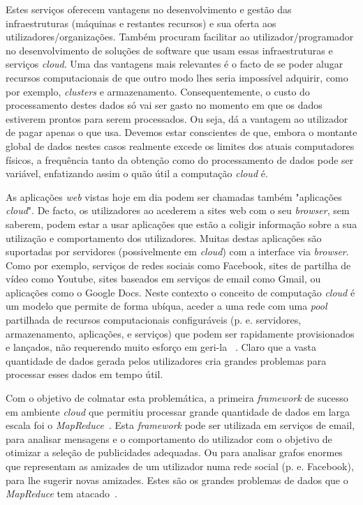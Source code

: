 Estes serviços oferecem vantagens no desenvolvimento e gestão das infraestruturas (máquinas e restantes recursos) e sua oferta aos utilizadores/organizações. Também procuram facilitar ao utilizador/programador no desenvolvimento de soluções de software que usam essas infraestruturas e serviços \textit{\textit{cloud}}. Uma das vantagens mais relevantes é o facto de se poder alugar recursos computacionais de que outro modo lhes seria impossível adquirir, como por exemplo, \textit{clusters} e armazenamento. Consequentemente, o custo do processamento destes dados só vai ser gasto no momento em que os dados estiverem prontos para serem processados. Ou seja, dá a vantagem ao utilizador de pagar apenas o que usa. Devemos estar conscientes de que, embora o montante global de dados nestes casos realmente excede os limites dos atuais computadores físicos, a frequência tanto da obtenção como do processamento de dados pode ser variável, enfatizando assim o quão útil a computação \textit{\textit{cloud}} é.

As aplicações \textit{web} vistas hoje em dia podem ser chamadas também "aplicações \textit{\textit{cloud}}". De facto, os utilizadores ao acederem a sites web com o seu \textit{browser}, sem saberem, podem estar a usar aplicações que estão a coligir informação sobre a sua utilização e comportamento dos utilizadores. Muitas destas aplicações são suportadas por servidores (possivelmente em \textit{cloud}) com a interface via \textit{browser}. Como por exemplo, serviços de redes sociais como Facebook, sites de partilha de vídeo como Youtube, sites baseados em serviços de email como Gmail, ou aplicações como o Google Docs. Neste contexto o conceito de computação \textit{\textit{cloud}} é um modelo que permite de forma ubíqua, aceder a uma rede com uma \textit{pool} partilhada de recursos computacionais configuráveis (p. e. servidores, armazenamento, aplicações, e serviços) que podem ser rapidamente provisionados e lançados, não requerendo muito esforço em geri-la ~\cite{mell2011nist}. Claro que a vasta quantidade de dados gerada pelos utilizadores cria grandes problemas para processar esses dados em tempo útil.

Com o objetivo de colmatar esta problemática, a primeira \textit{framework} de sucesso em ambiente \textit{\textit{cloud}} que permitiu processar grande quantidade de dados em larga escala foi o \textit{MapReduce}~\cite{dean2008mapreduce}. Esta \textit{framework} pode ser utilizada em serviços de email, para analisar mensagens e o comportamento do utilizador com o objetivo de otimizar a seleção de publicidades adequadas. Ou para analisar grafos enormes que representam as amizades de um utilizador numa rede social (p. e. Facebook), para lhe sugerir novas amizades. Estes são os grandes problemas de dados que o \textit{\textit{MapReduce}} tem atacado~\cite{lin2010data}.

